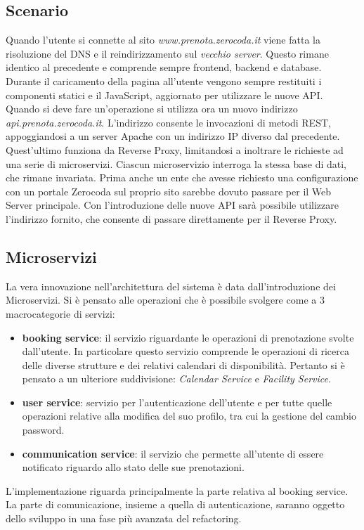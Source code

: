 \subsection{Scenario}
Quando l'utente si connette al sito \emph{www.prenota.zerocoda.it} viene fatta la risoluzione del DNS e il reindirizzamento sul \textit{vecchio server}. Questo rimane identico al precedente e comprende sempre frontend, backend e database. Durante il caricamento della pagina all'utente vengono sempre restituiti i componenti statici e il JavaScript, aggiornato per utilizzare le nuove API. Quando si deve fare un'operazione si utilizza ora un nuovo indirizzo \emph{api.prenota.zerocoda.it}. L'indirizzo consente le invocazioni di metodi REST, appoggiandosi a un server Apache con un indirizzo IP diverso dal precedente. Quest'ultimo funziona da Reverse Proxy, limitandosi a inoltrare le richieste ad una serie di microservizi. Ciascun microservizio interroga la stessa base di dati, che rimane invariata. Prima anche un ente che avesse richiesto una configurazione con un portale Zerocoda sul proprio sito sarebbe dovuto passare per il Web Server principale. Con l'introduzione delle nuove API sarà possibile utilizzare l'indirizzo fornito, che consente di passare direttamente per il Reverse Proxy.

\subsection{Microservizi}
La vera innovazione nell'architettura del sistema è data dall'introduzione dei Microservizi. Si è pensato alle operazioni che è possibile svolgere come a 3 macrocategorie di servizi:
\begin{itemize}
    \item \textbf{booking service}: il servizio riguardante le operazioni di prenotazione svolte dall'utente. In  particolare questo servizio comprende le operazioni di ricerca delle diverse strutture e dei relativi calendari di disponibilità. Pertanto si è pensato a un ulteriore suddivisione: \emph{Calendar Service} e \emph{Facility Service}.
    \item \textbf{user service}: servizio per l'autenticazione dell'utente e per tutte quelle operazioni relative alla modifica del suo profilo, tra cui la gestione del cambio password.
    \item \textbf{communication service}: il servizio che permette all'utente di essere notificato riguardo allo stato delle sue prenotazioni. 
\end{itemize}
L'implementazione riguarda principalmente la parte relativa al booking service. La parte di comunicazione, insieme a quella di autenticazione, saranno oggetto dello sviluppo in una fase più avanzata del refactoring.

